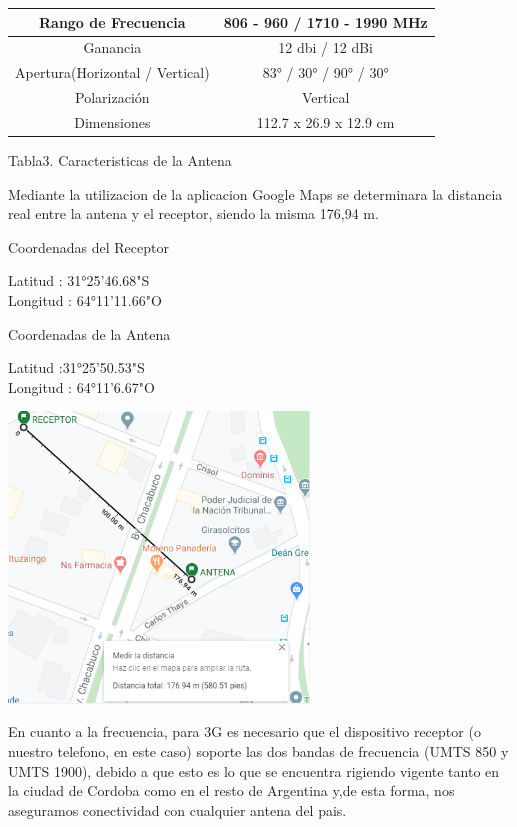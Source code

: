 \documentclass[conference, 9pt, a4paper]{IEEEtran}
\begin{document}
\begin{center}
\begin{tabular}{|c|c|}
\hline 
Rango de Frecuencia  & 806 - 960 / 1710 - 1990 MHz\\ 
\hline 
Ganancia & 12 dbi / 12 dBi \\ 
\hline 
Apertura(Horizontal / Vertical) & 83° / 30° / 90° / 30° \\ 
\hline 
Polarización & Vertical \\ 
\hline 
Dimensiones & 112.7 x 26.9 x 12.9 cm \\ 
\hline 
\end{tabular} 
\end{center}

\begin{center}
Tabla3. Caracteristicas de la Antena
\end{center}
Mediante la utilizacion de la aplicacion Google Maps se determinara la distancia real entre la antena y el receptor, siendo la misma 176,94 m.
\begin{center}
 Coordenadas del Receptor 
 \end{center} 
Latitud : 31°25'46.68"S\\
Longitud : 64°11'11.66"O \\
\begin{center}
 Coordenadas de la Antena
 \end{center} 
Latitud :31°25'50.53"S\\
Longitud :  64°11'6.67"O \\
\begin{center}
\includegraphics[width=8cm]{image/Captura.PNG} 
\end{center}

En cuanto a la frecuencia, para 3G es necesario que el
dispositivo receptor (o nuestro telefono, en este caso) soporte las dos bandas de frecuencia (UMTS 850 y UMTS 1900), debido a que esto es lo que se encuentra rigiendo vigente tanto en la ciudad de Cordoba como en el resto de Argentina y,de esta forma, nos aseguramos conectividad con cualquier antena del pais.
\end{document}
